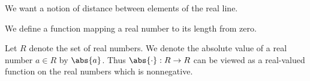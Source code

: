 

We want a notion
of distance between
elements of the real
line.


We define a function
mapping a real number
to its length from zero.


Let $R$ denote the set of real numbers.
We denote the absolute value
of a real number $a \in R$ by $\abs{a}$.
Thus $\abs{\cdot}: R \to R$ can be viewed
as a real-valued function on the real numbers
which is nonnegative.
